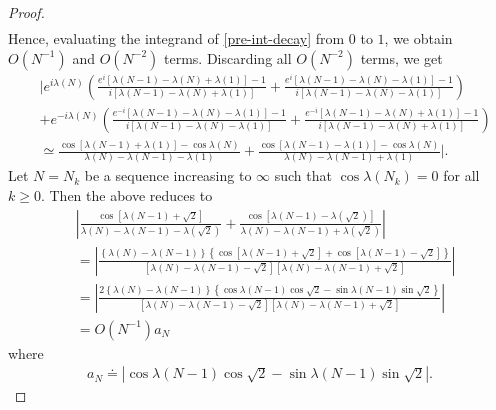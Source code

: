 \documentclass[12pt,reqno]{amsart}
\numberwithin{equation}{section}  %
\begin{document}
\begin{proof}
\begin{equation*}
\begin{split}
\end{split}
\end{equation*}
%
%
Hence, evaluating the integrand of \eqref{pre-int-decay} from $0$ to $1$, we obtain $O(N^{-1})$ and $O(N^{-2})$ terms. Discarding all $O(N^{-2})$ terms, we get
%
%
\begin{equation*}
\begin{split}
  & | e^{i \lambda(N)}\left( \frac{e^{i}[\lambda(N-1) - \lambda(N) + \lambda(1)] - 1}{i[\lambda(N-1) - \lambda(N) + \lambda(1)]} + 
  \frac{e^{i}[\lambda(N-1) - \lambda(N) - \lambda(1)] - 1}{i[\lambda(N-1) - \lambda(N) - \lambda(1)]} \right)
  \\
  & + e^{-i \lambda(N)}\left( \frac{e^{-i}[\lambda(N-1) - \lambda(N) - \lambda(1)] - 1}{i[\lambda(N-1) - \lambda(N) - \lambda(1)]} + 
  \frac{e^{-i}[\lambda(N-1) - \lambda(N) + \lambda(1)] - 1}{i[\lambda(N-1) - \lambda(N) + \lambda(1)]} \right)
  \\
  & \simeq \frac{\cos[\lambda(N-1) + \lambda(1)] - \cos \lambda(N)}{\lambda(N) - \lambda(N-1) - \lambda(1)} + \frac{\cos[\lambda(N-1) - \lambda(1)] - \cos \lambda(N)}{\lambda(N) - \lambda(N-1) + \lambda(1)} |. 
\end{split}
\end{equation*}
%
%
Let $N = N_{k}$ be a sequence increasing to $\infty$ such that $\cos \lambda(N_{k}) = 0$ for all $k \ge 0$. Then the above reduces to 
%
%
%
%
\begin{equation}
  \label{puy}
\begin{split}
  & | \frac{\cos[\lambda(N-1) + \sqrt{2}] }{\lambda(N) - \lambda(N-1) - \lambda(\sqrt{2})} + \frac{\cos[\lambda(N-1) - \lambda(\sqrt{2})] }{\lambda(N) - \lambda(N-1) + \lambda(\sqrt{2})} |
  \\
  & = | \frac{\left \{ \lambda(N) - \lambda(N-1) \right \}\left \{ \cos[\lambda(N-1) + \sqrt{2}] + \cos\left[ \lambda(N-1) - \sqrt{2} \right] \right \}}{[\lambda(N) - \lambda(N-1) - \sqrt{2}][\lambda(N) - \lambda(N-1) + \sqrt{2}]} |
  \\
  & = | \frac{2 \left \{ \lambda(N) - \lambda(N-1) \right \}\left \{ \cos\lambda(N-1) \cos \sqrt{2} - \sin\lambda(N-1) \sin \sqrt{2} \right \}}{[\lambda(N) - \lambda(N-1) - \sqrt{2}][\lambda(N) - \lambda(N-1) + \sqrt{2}]} |
  \\
  & = O(N^{-1})a_{N}
\end{split}
\end{equation}
%
%
where
%
%
\begin{equation*}
\begin{split}
  a_{N} \doteq | \cos\lambda(N-1) \cos \sqrt{2} - \sin\lambda(N-1) \sin \sqrt{2} |.

\end{split}
\end{equation*}
\end{proof}
\end{document}
